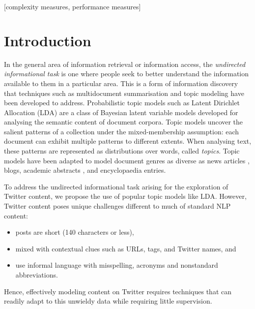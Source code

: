 \documentclass{sig-alternate}
\begin{document}
[complexity measures, performance measures]



\section*{Introduction}
\label{sec:intro}

In the general area of information retrieval or information access,
the {\it undirected informational task} \cite{RoseLev} is one where
people seek to better understand the information available to them in
a particular area.  This is a form of information discovery that
techniques such as multidocument summarisation \cite{radev02} and
topic modeling have been developed to address.  Probabilistic topic
models such as Latent Dirichlet Allocation (LDA) \cite{blei03} are a
class of Bayesian latent variable models developed for analysing the
semantic content of document corpora.  Topic models uncover the salient
patterns of a collection under the mixed-membership assumption: each
document can exhibit multiple patterns to different extents.  When
analysing text, these patterns are represented as distributions over
words, called \textit{topics}.  Topic models have been adapted to model
document genres as diverse as news articles \cite{baldwin11}, blogs,
academic abstracts \cite{acadz}, and encyclopaedia entries.

To address the undirected informational task arising for the 
exploration of Twitter content, we propose the use of popular topic
models like LDA.  However, 
Twitter content poses unique challenges different to much of standard
NLP content: 
\begin{itemize}
\item posts are short (140 characters or less),
\item mixed with contextual clues such as URLs, tags, and Twitter names, and
\item use informal language with misspelling, acronyms and 
nonstandard abbreviations.
\end{itemize}
Hence, effectively modeling content on Twitter
requires techniques that can readily adapt to this unwieldy data while
requiring little supervision.  
\end{document}
